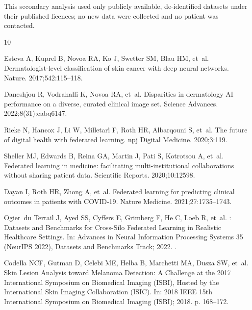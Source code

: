 \documentclass[VANCOUVER,Times1COL]{WileyNJDv5}
\begin{document}
This secondary analysis used only publicly available, de-identified datasets under their published
licences; no new data were collected and no patient was contacted. %


\begin{thebibliography}{10}

Esteva A, Kuprel B, Novoa RA, Ko J, Swetter SM, Blau HM, et~al.
\newblock Dermatologist-level classification of skin cancer with deep neural
  networks.
\newblock Nature. 2017;542:115--118.

Daneshjou R, Vodrahalli K, Novoa RA, et~al.
\newblock Disparities in dermatology {AI} performance on a diverse, curated
  clinical image set.
\newblock Science Advances. 2022;8(31):eabq6147.

Rieke N, Hancox J, Li W, Milletar{\`i} F, Roth HR, Albarqouni S, et~al.
\newblock The future of digital health with federated learning.
\newblock npj Digital Medicine. 2020;3:119.

Sheller MJ, Edwards B, Reina GA, Martin J, Pati S, Kotrotsou A, et~al.
\newblock Federated learning in medicine: facilitating multi-institutional
  collaborations without sharing patient data.
\newblock Scientific Reports. 2020;10:12598.

Dayan I, Roth HR, Zhong A, et~al.
\newblock Federated learning for predicting clinical outcomes in patients with
  {COVID-19}.
\newblock Nature Medicine. 2021;27:1735--1743.

Ogier~du Terrail J, Ayed SS, Cyffers E, Grimberg F, He C, Loeb R, et~al.
: Datasets and Benchmarks for Cross-Silo Federated Learning
  in Realistic Healthcare Settings.
\newblock In: Advances in Neural Information Processing Systems 35 (NeurIPS
  2022), Datasets and Benchmarks Track; 2022. .

Codella NCF, Gutman D, Celebi ME, Helba B, Marchetti MA, Dusza SW, et~al.
\newblock Skin Lesion Analysis toward Melanoma Detection: A Challenge at the
  2017 International Symposium on Biomedical Imaging ({ISBI}), Hosted by the
  International Skin Imaging Collaboration ({ISIC}).
\newblock In: 2018 IEEE 15th International Symposium on Biomedical Imaging
  (ISBI); 2018. p. 168--172.


\end{thebibliography}
\end{document}
